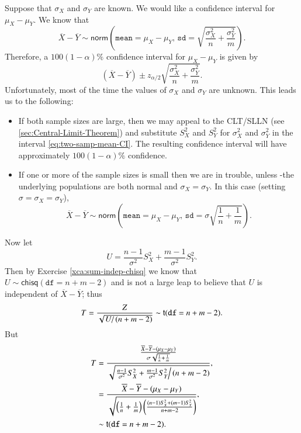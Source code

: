 \documentclass[captions=tableheading]{scrbook}
\begin{document}
Suppose that \(\sigma_{X}\) and \(\sigma_{Y}\) are known. We would like a confidence interval for \(\mu_{X}-\mu_{Y}\). We know that 
\begin{equation}
\overline{X}-\overline{Y}\sim\mathsf{norm}\left(\mathtt{mean}=\mu_{X}-\mu_{Y},\,\mathtt{sd}=\sqrt{\frac{\sigma_{X}^{2}}{n}+\frac{\sigma_{Y}^{2}}{m}}\right).
\end{equation}
Therefore, a \( 100(1-\alpha)\% \) confidence interval for \(\mu_{X}-\mu_{Y}\) is given by
\begin{equation}
\left(\overline{X}-\overline{Y}\right)\pm z_{\alpha/2}\sqrt{\frac{\sigma_{X}^{2}}{n}+\frac{\sigma_{Y}^{2}}{m}}.\label{eq:two-samp-mean-CI}
\end{equation}
Unfortunately, most of the time the values of \(\sigma_{X}\) and \(\sigma_{Y}\) are unknown. This leads us to the following:
\begin{itemize}
\item If both sample sizes are large, then we may appeal to the CLT/SLLN (see \ref{sec:Central-Limit-Theorem}) and substitute \(S_{X}^{2}\) and \(S_{Y}^{2}\) for \(\sigma_{X}^{2}\) and \(\sigma_{Y}^{2}\) in the interval \ref{eq:two-samp-mean-CI}. The resulting confidence interval will have approximately \(100(1-\alpha)\%\) confidence.
\item If one or more of the sample sizes is small then we are in trouble, unless
    -the underlying populations are both normal and \(\sigma_{X}=\sigma_{Y}\). In this case (setting \(\sigma=\sigma_{X}=\sigma_{Y}\)), 
    \begin{equation}
    \overline{X}-\overline{Y}\sim\mathsf{norm}\left(\mathtt{mean}=\mu_{X}-\mu_{Y},\,\mathtt{sd}=\sigma\sqrt{\frac{1}{n}+\frac{1}{m}}\right).
    \end{equation}
\end{itemize}
Now let
\begin{equation}
U=\frac{n-1}{\sigma^{2}}S_{X}^{2}+\frac{m-1}{\sigma^{2}}S_{Y}^{2}.
\end{equation}
Then by Exercise \ref{xca:sum-indep-chisq} we know that \(U\sim\mathsf{chisq}(\mathtt{df}=n+m-2)\) and is not a large leap to believe that \(U\) is independent of \(\overline{X}-\overline{Y}\); thus
\begin{equation}
T=\frac{Z}{\sqrt{\left.U\right\slash (n+m-2)}}\sim\mathsf{t}(\mathtt{df}=n+m-2).
\end{equation}
But
\begin{align*}
T & =\frac{\frac{\overline{X}-\overline{Y}-(\mu_{X}-\mu_{Y})}{\sigma\sqrt{\frac{1}{n}+\frac{1}{m}}}}{\sqrt{\left.\frac{n-1}{\sigma^{2}}S_{X}^{2}+\frac{m-1}{\sigma^{2}}S_{Y}^{2}\right\slash (n+m-2)}},\\
 & =\frac{\overline{X}-\overline{Y}-(\mu_{X}-\mu_{Y})}{\sqrt{\left(\frac{1}{n}+\frac{1}{m}\right)\left(\frac{(n-1)S_{X}^{2}+(m-1)S_{Y}^{2}}{n+m-2}\right)}},\\
 & \sim\mathsf{t}(\mathtt{df}=n+m-2).
\end{align*}
\end{document}
